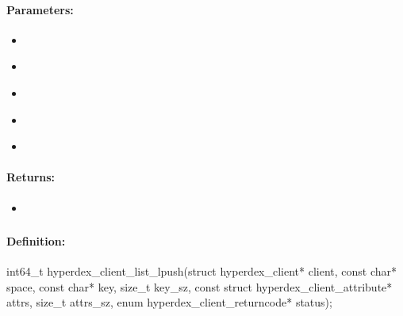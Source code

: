 \paragraph{Parameters:}
\begin{itemize}[noitemsep]
\item {}\\

\item {}\\

\item {}\\

\item {}\\

\item {}\\

\end{itemize}

\paragraph{Returns:}
\begin{itemize}[noitemsep]
\item {}\\

\end{itemize}

\pagebreak
\subsubsection{}
\label{api:c:list_lpush}


\paragraph{Definition:}
\begin{ccode}
int64_t hyperdex_client_list_lpush(struct hyperdex_client* client,
        const char* space,
        const char* key, size_t key_sz,
        const struct hyperdex_client_attribute* attrs, size_t attrs_sz,
        enum hyperdex_client_returncode* status);
\end{ccode}


